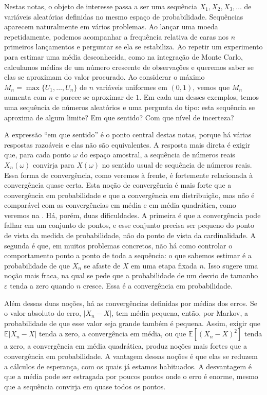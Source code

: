\documentclass[12pt,portuguese]{article}
\theoremstyle{definition}
\theoremstyle{plainexercise}
\theoremstyle{starredexercise}
\theoremstyle{definition}
\begin{document}
Nestas notas, o objeto de interesse passa a ser uma sequência
$X_1,X_2,X_3,\ldots$ de variáveis aleatórias definidas no mesmo espaço de
probabilidade. Sequências aparecem naturalmente em vários problemas. Ao lançar
uma moeda repetidamente, podemos acompanhar a frequência relativa de caras nos
$n$ primeiros lançamentos e perguntar se ela se estabiliza. Ao repetir um
experimento para estimar uma média desconhecida, como na integração de Monte
Carlo, calculamos médias de um número crescente de observações e queremos saber
se elas se aproximam do valor procurado. Ao considerar o máximo
$M_n=\max\{U_1,\ldots,U_n\}$ de $n$ variáveis uniformes em $(0,1)$, vemos que
$M_n$ aumenta com $n$ e parece se aproximar de $1$. Em cada um desses exemplos,
temos uma sequência de números aleatórios e uma pergunta do tipo: esta sequência se
aproxima de algum limite? Em que sentido? Com que nível de incerteza?

A expressão ``em que sentido'' é o ponto central destas notas, porque há várias
respostas razoáveis e elas não são equivalentes. A resposta mais direta é
exigir que, para cada ponto $\omega$ do espaço amostral, a sequência de números
reais $X_n(\omega)$ convirja para $X(\omega)$ no sentido usual de sequência
de números reais. Essa forma de convergência, como veremos à frente,
é fortemente relacionada à convergência quase certa. Esta noção de convergência
é mais forte que a convergência em probabilidade
e que a convergência em distribuição, mas não é comparável com as
convergências em média e em média quadrática, como veremos na
.
Há, porém, duas dificuldades. A primeira é que a convergência pode falhar em
um conjunto de pontos, e esse conjunto precisa ser pequeno do ponto de vista da
medida de probabilidade, não do ponto de vista da cardinalidade. A segunda é
que, em muitos problemas concretos, não há como controlar o comportamento
ponto a ponto de toda a sequência: o que sabemos estimar é a probabilidade de
que $X_n$ se afaste de $X$ em uma etapa fixada $n$. Isso sugere uma noção mais
fraca, na qual se pede que a probabilidade de um desvio de tamanho
$\varepsilon$ tenda a zero quando $n$ cresce. Essa é a convergência em
probabilidade.

Além dessas duas noções, há as convergências definidas por médias dos erros.
Se o valor absoluto do erro, $|X_n-X|$, tem média pequena, então, por Markov,
a probabilidade de que esse valor seja grande também é pequena. Assim, exigir
que $\mathbb{E}|X_n-X|$ tenda a zero, a convergência em
média, ou que $\mathbb{E}[(X_n-X)^2]$ tenda a zero, a convergência em média
quadrática, produz noções mais fortes que a convergência em probabilidade. A
vantagem dessas noções é que elas se reduzem a cálculos de esperança, com os
quais já estamos habituados. A desvantagem é que a média pode ser estragada por
poucos pontos onde o erro é enorme, mesmo que a sequência convirja em quase
todos os pontos.
\end{document}
